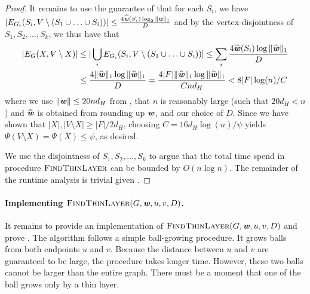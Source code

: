 \begin{proof}
It remains to use the guarantee of  that for each $S_i$, we have $|E_{G_i}(S_i, V \setminus (S_1 \cup \ldots \cup S_i))| \leq \frac{4  \widehat{\boldsymbol{\mathit{w}}}(S_i) \log_2 \|\boldsymbol{{\mathit{w}}}\|_1 }{D}$ and by the vertex-disjointness of $S_1, S_2, \ldots, S_k$, we thus have that
\begin{align*}
    |E_G(X, V \setminus X)| &\leq | \bigcup_i E_{G_i}(S_i, V \setminus (S_1 \cup \ldots \cup S_i))| \leq \sum_i \frac{4  \widehat{\boldsymbol{\mathit{w}}}(S_i) \log \|\widehat{\boldsymbol{\mathit{w}}}\|_1 }{D} \\
    &\leq \frac{4  \|\widehat{\boldsymbol{\mathit{w}}}\|_1 \log \|\widehat{\boldsymbol{\mathit{w}}}\|_1 }{D} =
    \frac{4 |F| \|\widehat{\boldsymbol{\mathit{w}}}\|_1 \log \|\widehat{\boldsymbol{\mathit{w}}}\|_1 }{C n d_H} < 8|F| \log(n)/C
\end{align*}
where we use $\|\boldsymbol{{\mathit{w}}}\| \leq 20n d_H$ from , that $n$ is reasonably large (such that $20 d_H < n$) and $\widehat{\boldsymbol{\mathit{w}}}$ is obtained from rounding up $\boldsymbol{{\mathit{w}}}$, and our choice of $D$. Since we have shown that $|X|, |V \setminus X| \geq |F|/2d_H$, choosing $C = 16 d_H \log(n)/\psi$ yields $\Psi(V \setminus X) = \Psi(X) \leq \psi$, as desired.

We use the disjointness of $S_1, S_2, \ldots, S_k$ to argue that the total time spend in procedure $\textsc{FindThinLayer}$ can be bounded by $O(n \log n)$. The remainder of the runtime analysis is trivial given .
\end{proof}

\paragraph{Implementing $\textsc{FindThinLayer}(G, \boldsymbol{{\mathit{w}}}, u, v, D)$.}
It remains to provide an implementation of $\textsc{FindThinLayer}(G, \boldsymbol{{\mathit{w}}}, u, v, D)$ and prove .
The algorithm follows a simple ball-growing procedure.
It grows balls from both endpoints $u$ and $v.$
Because the distance between $u$ and $v$ are guaranteed to be large, the procedure takes longer time.
However, these two balls cannot be larger than the entire graph.
There must be a moment that one of the ball grows only by a thin layer.


